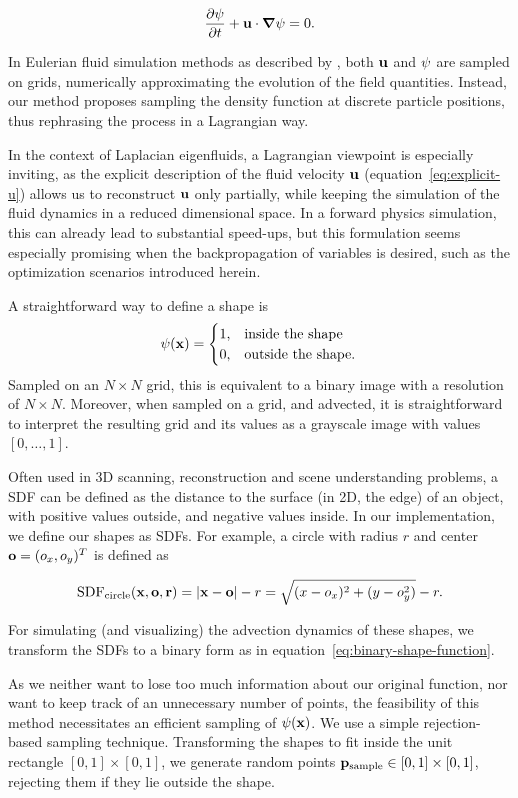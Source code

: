 $$\pdv{\psi}{t} + \vb{u}\cdot \grad{\psi} = 0.$$

In Eulerian fluid simulation methods as described by \cite{StableFluids}, both
$\vb{u}$ and $\vb{\psi}$ are sampled on grids, numerically approximating the
evolution of the field quantities. Instead, our method proposes sampling the
density function at discrete particle positions, thus rephrasing the process in
a Lagrangian way.

In the context of Laplacian eigenfluids, a Lagrangian viewpoint is especially
inviting, as the explicit description of the fluid velocity $\vb{u}$
(equation~\eqref{eq:explicit-u}) allows us to reconstruct $\vb{u}$ only
partially, while keeping the simulation of the fluid dynamics in a reduced
dimensional space. In a forward physics simulation, this can already lead to
substantial speed-ups, but this formulation seems especially promising when the
backpropagation of variables is desired, such as the optimization scenarios
introduced herein.

A straightforward way to define a shape is
\begin{equation}\label{eq:binary-shape-function}
\psi(\vb{x}) = 
\begin{cases}
  1, & \qq*{inside the shape}\\
  0, & \text{outside the shape}.\\
\end{cases}
\end{equation}
Sampled on an $N \times N$ grid, this is equivalent to a binary image with
a resolution of $N \times N$. Moreover, when sampled on a grid, and advected,
it is straightforward to interpret the resulting grid and its values as
a grayscale image with values $[0,\dots,1]$.

Often used in 3D scanning, reconstruction and scene understanding problems,
a \acf{SDF} can be defined as the distance to the surface (in 2D, the edge) of
an object, with positive values outside, and negative values inside. In our
implementation, we define our shapes as \acp{SDF}. For example, a circle with
radius $r$ and center $\vb{o} = (o_x, o_y)^T$ is defined as

$$\text{SDF}_{\text{circle}}(\vb{x, \vb{o}, r}) 
  = \abs{\vb{x}-\vb{o}} - r
  = \sqrt{(x-o_x)^2 + (y-o_y^2)} - r.$$

For simulating (and visualizing) the advection dynamics of these shapes, we
transform the SDFs to a binary form as in
equation~\eqref{eq:binary-shape-function}.

As we neither want to lose too much information about our original function, nor
want to keep track of an unnecessary number of points, the feasibility of this
method necessitates an efficient sampling of $\psi(\vb{x})$. We use a simple
rejection-based sampling technique. Transforming the shapes to fit inside the
unit rectangle $[0,1]\times[0,1]$, we generate random points
$\vb{p}_\text{sample}\in [0,1]\times[0,1]$, rejecting them if they lie outside
the shape.

